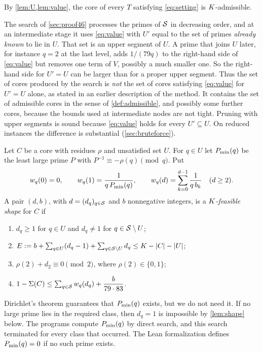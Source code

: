 \documentclass[11pt]{article}
\begin{document}
By \cref{lem:U,lem:value}, the core of every $T$ satisfying \eqref{eq:setting} is $K$-admissible.

\begin{remark}\label{rem:segments}
The search of \cref{sec:proof46} processes the primes of $\mathcal{S}$ in decreasing order, and at an intermediate stage it uses \eqref{eq:value} with $U'$ equal to the set of primes \emph{already known} to lie in $U$. That set is an upper segment of $U$.
A prime that joins $U$ later, for instance $q=2$ at the last level, adds $1/(79q)$ to the right-hand side of \eqref{eq:value} but removes one term of $V$, possibly a much smaller one. So the right-hand side for $U'=U$ can be larger than for a proper upper segment.
Thus the set of cores produced by the search is \emph{not} the set of cores satisfying \eqref{eq:value} for $U'=U$ alone, as stated in an earlier description of the method. It contains the set of admissible cores in the sense of \cref{def:admissible}, and possibly some further cores, because the bounds used at intermediate nodes are not tight.
Pruning with upper segments is sound because \eqref{eq:value} holds for every $U'\subseteq U$.
On reduced instances the difference is substantial (\cref{sec:bruteforce}).
\end{remark}

\begin{definition}[Shapes]\label{def:shape}
Let $C$ be a core with residues $\rho$ and unsatisfied set $U$. For $q\in U$ let $P_{\min}(q)$ be the least large prime $P$ with $P^{-1}\equiv-\rho(q)\pmod q$. Put
\[
w_q(0)=0,\qquad w_q(1)=\frac{1}{q\,P_{\min}(q)},\qquad w_q(d)=\sum_{k=0}^{d-1}\frac1{q\,b_k}\quad(d\ge2).
\]
A pair $(d,b)$, with $d=(d_q)_{q\in\mathcal{S}}$ and $b$ nonnegative integers, is a \emph{$K$-feasible shape} for $C$ if
\begin{enumerate}[label=\textup{(S\arabic*)}]
\item\label{S1} $d_q\ge1$ for $q\in U$ and $d_q\ne1$ for $q\in\mathcal{S}\setminus U$;
\item\label{S2} $E:=b+\sum_{q\in U}(d_q-1)+\sum_{q\in\mathcal{S}\setminus U}d_q\le K-\lvert C\rvert-\lvert U\rvert$;
\item\label{S3} $\rho(2)+d_2\equiv0\pmod2$, where $\rho(2)\in\{0,1\}$;
\item\label{S4} $1-\Sigma(C)\le\sum_{q\in\mathcal{S}}w_q(d_q)+\dfrac{b}{79\cdot83}$.
\end{enumerate}
\end{definition}

Dirichlet's theorem guarantees that $P_{\min}(q)$ exists, but we do not need it. If no large prime lies in the required class, then $d_q=1$ is impossible by \cref{lem:shape} below. The programs compute $P_{\min}(q)$ by direct search, and this search terminated for every class that occurred. The Lean formalization defines $P_{\min}(q)=0$ if no such prime exists.
\end{document}
